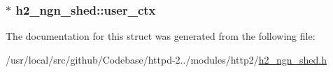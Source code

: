 \subsubsection[{\texorpdfstring{user\+\_\+ctx}{user_ctx}}]{$\ast$ h2\+\_\+ngn\+\_\+shed\+::user\+\_\+ctx}\hypertarget{structh2__ngn__shed_a1d88471a384d68e232b65ac42f105898}{}\label{structh2__ngn__shed_a1d88471a384d68e232b65ac42f105898}


The documentation for this struct was generated from the following file\+:\begin{DoxyCompactItemize}
\item 
/usr/local/src/github/\+Codebase/httpd-\/2../modules/http2/\hyperlink{h2__ngn__shed_8h}{h2\+\_\+ngn\+\_\+shed.\+h}\end{DoxyCompactItemize}
